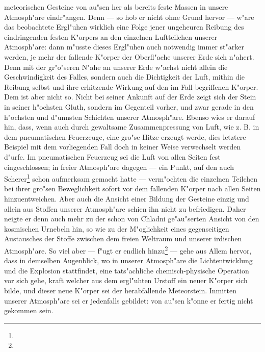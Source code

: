 \documentclass[a4paper, 8pt, oneside, polutonikogreek, german]{article}
\begin{document}
meteorischen Gesteine von au"sen her als bereits feste Massen in unsere Atmosph"are eindr"angen. Denn --- so hob er nicht ohne Grund hervor --- w"are das beobachtete Ergl"uhen wirklich eine Folge jener ungeheuren Reibung des eindringenden festen K"orpers an den einzelnen Luftteilchen unserer Atmosph"are: dann m"usste dieses Ergl"uhen auch notwendig immer st"arker werden, je mehr der fallende K"orper der Oberfl"ache unserer Erde sich n"ahert. Denn mit der gr"o"seren N"ahe an unserer Erde w"achst nicht allein die Geschwindigkeit des Falles, sondern auch die Dichtigkeit der Luft, mithin die Reibung selbst und ihre erhitzende Wirkung auf den im Fall begriffenen K"orper. Dem ist aber nicht so. Nicht bei seiner Ankunft auf der Erde zeigt sich der Stein in seiner h"ochsten Gluth, sondern im Gegenteil vorher, und zwar gerade in den h"ochsten und d"unnsten Schichten unserer Atmosph"are. Ebenso wies er darauf hin, dass, wenn auch durch gewaltsame Zusammenpressung von Luft, wie z. B. in dem pneumatischen Feuerzeuge, eine gro"se Hitze erzeugt werde, dies letztere Beispiel mit dem vorliegenden Fall doch in keiner Weise verwechselt werden d"urfe. Im pneumatischen Feuerzeug sei die Luft von allen Seiten fest eingeschlossen; in freier Atmosph"are dagegen --- ein Punkt, auf den auch Scherer\footnote{} schon aufmerksam gemacht hatte --- verm"ochten die einzelnen Teilchen bei ihrer gro"sen Beweglichkeit sofort vor dem fallenden K"orper nach allen Seiten hinzuentweichen. Aber auch die Ansicht einer Bildung der Gesteine einzig und allein aus Stoffen unserer Atmosph"are schien ihn nicht zu befriedigen. Daher neigte er denn auch mehr zu der schon von Chladni ge"au"serten Ansicht von den kosmischen Urnebeln hin, so wie zu der M"oglichkeit eines gegenseitigen Austausches der Stoffe zwischen dem freien Weltraum und unserer irdischen Atmosph"are. So viel aber --- f"ugt er endlich hinzu\footnote{} --- gehe aus Allem hervor, dass in demselben Augenblick, wo in unserer Atmosph"are die Lichtentwicklung und die Explosion stattfindet, eine tats"achliche chemisch-physische Operation vor sich gehe, kraft welcher aus dem ergl"uhten Urstoff ein neuer K"orper sich bilde, und dieser neue K"orper sei der herabfallende Meteorstein. Inmitten unserer Atmosph"are sei er jedenfalls gebildet: von au"sen k"onne er fertig nicht gekommen sein.
\end{document}
